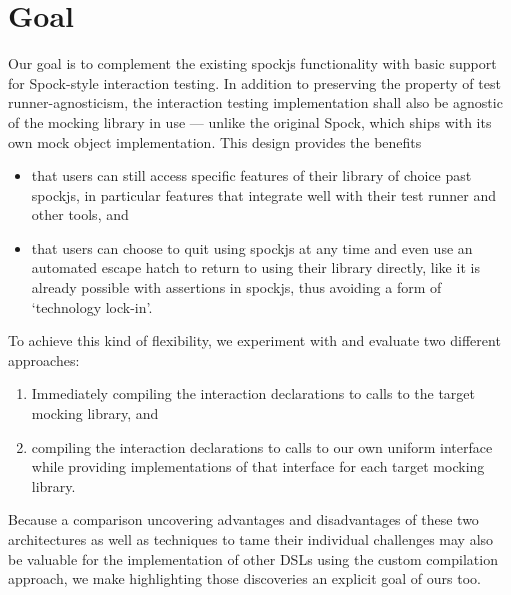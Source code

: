 \section{Goal}
Our goal is to complement the existing spockjs functionality
with basic support for Spock-style interaction testing.
In addition to preserving the property of test runner-agnosticism,
the interaction testing implementation shall also be
agnostic of the mocking library in use ---
unlike the original Spock, which ships with its own mock object implementation.
This design provides the benefits
\begin{itemize}
  \item that users can still access specific features
    of their library of choice past spockjs,
    in particular features that integrate well with
    their test runner and other tools, and
  \item that users can choose to quit using spockjs at any time
    and even use an automated escape hatch to return to using their library directly,
    like it is already possible with assertions in spockjs,
    thus avoiding a form of `technology lock-in'.
\end{itemize}

To achieve this kind of flexibility,
we experiment with and evaluate two different approaches:
\begin{enumerate}
  \item Immediately compiling the interaction declarations
    to calls to the target mocking library, and
  \item compiling the interaction declarations
    to calls to our own uniform interface
    while providing implementations
    of that interface
    for each target mocking library.
\end{enumerate}
Because a comparison uncovering advantages and disadvantages of these two architectures
as well as techniques to tame their individual challenges
may also be valuable for the implementation of other DSLs
using the custom compilation approach,
we make highlighting those discoveries an explicit goal of ours too.

